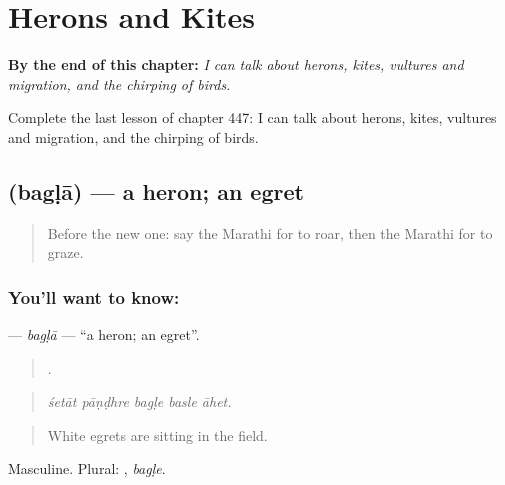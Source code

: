 
\chapter{Herons and Kites}
\label{ch:mr-herons-and-kites}

\begin{chapteropening}
\textbf{By the end of this chapter:} \emph{I can talk about herons, kites, vultures and migration, and the chirping of birds.}

Complete the last lesson of chapter 447: I can talk about herons, kites, vultures and migration, and the chirping of birds.
\end{chapteropening}

\section[\texorpdfstring{\mr{बगळा} (bagḷā)}{बगळा (bagḷā)}]{ (bagḷā) — a heron; an egret}

\label{lesson:MR-C447-bagla}



\begin{quote}
Before the new one: say the Marathi for to roar, then the Marathi for to graze.
\end{quote}

\subsection*{You'll want to know: }
\textbf{} — \emph{bagḷā} — \textquotedblleft{}a heron; an egret\textquotedblright{}.

\begin{quote}
    .
\end{quote}

\begin{quote}
\emph{śetāt pāṇḍhre bagḷe basle āhet.}
\end{quote}

\begin{quote}
White egrets are sitting in the field.
\end{quote}

Masculine. Plural: , \emph{bagḷe}.

